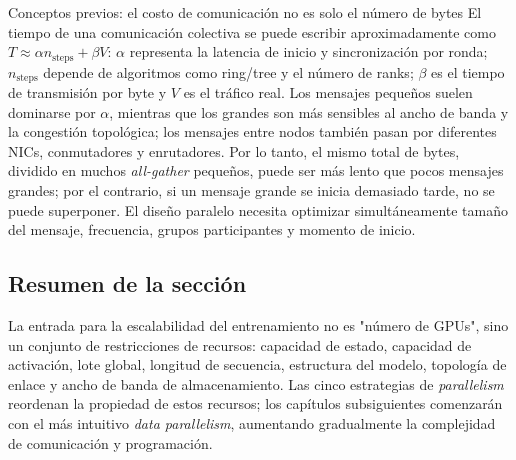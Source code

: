 \begin{knowledgebox}{Conceptos previos: el costo de comunicación no es solo el número de bytes}
El tiempo de una comunicación colectiva se puede escribir aproximadamente como $T\approx \alpha n_{\mathrm{steps}}+\beta V$: $\alpha$ representa la latencia de inicio y sincronización por ronda; $n_{\mathrm{steps}}$ depende de algoritmos como ring/tree y el número de ranks; $\beta$ es el tiempo de transmisión por byte y $V$ es el tráfico real. Los mensajes pequeños suelen dominarse por $\alpha$, mientras que los grandes son más sensibles al ancho de banda y la congestión topológica; los mensajes entre nodos también pasan por diferentes NICs, conmutadores y enrutadores. Por lo tanto, el mismo total de bytes, dividido en muchos \textit{all-gather} pequeños, puede ser más lento que pocos mensajes grandes; por el contrario, si un mensaje grande se inicia demasiado tarde, no se puede superponer. El diseño paralelo necesita optimizar simultáneamente tamaño del mensaje, frecuencia, grupos participantes y momento de inicio.
\end{knowledgebox}

\subsection{Resumen de la sección}

La entrada para la escalabilidad del entrenamiento no es "número de GPUs", sino un conjunto de restricciones de recursos: capacidad de estado, capacidad de activación, lote global, longitud de secuencia, estructura del modelo, topología de enlace y ancho de banda de almacenamiento. Las cinco estrategias de \textit{parallelism} reordenan la propiedad de estos recursos; los capítulos subsiguientes comenzarán con el más intuitivo \textit{data parallelism}, aumentando gradualmente la complejidad de comunicación y programación.


